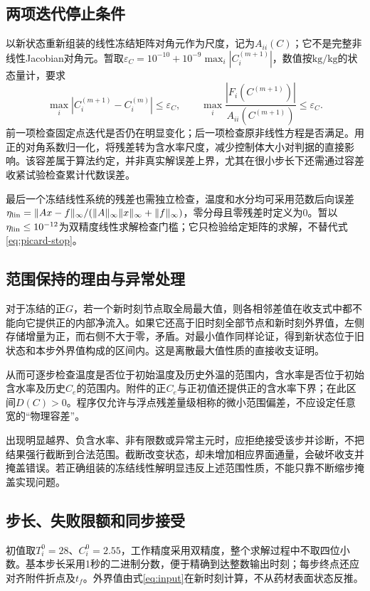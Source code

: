 \documentclass[UTF8,a4paper,zihao=-4,fontset=none]{ctexart}
\numberwithin{equation}{section}
\begin{document}
\subsection{两项迭代停止条件}
以新状态重新组装的线性冻结矩阵对角元作为尺度，记为$A_{ii}(C)$；它不是完整非线性Jacobian对角元。暂取$\varepsilon_C=10^{-10}+10^{-9}\max_i|C_i^{(m+1)}|$，数值按$\mathrm{kg/kg}$的状态量计，要求
\begin{equation}
\max_i|C_i^{(m+1)}-C_i^{(m)}|\le\varepsilon_C,
\qquad
\max_i\frac{|F_i(C^{(m+1)})|}{A_{ii}(C^{(m+1)})}\le\varepsilon_C.
\label{eq:picard-stop}
\end{equation}
前一项检查固定点迭代是否仍在明显变化；后一项检查原非线性方程是否满足。用正的对角系数归一化，将残差转为含水率尺度，减少控制体大小对判据的直接影响。该容差属于算法约定，并非真实解误差上界，尤其在很小步长下还需通过容差收紧试验检查累计代数误差。

最后一个冻结线性系统的残差也需独立检查，温度和水分均可采用范数后向误差$\eta_{\rm lin}=\|Ax-f\|_\infty/(\|A\|_\infty\|x\|_\infty+\|f\|_\infty)$，零分母且零残差时定义为0。暂以$\eta_{\rm lin}\le10^{-12}$为双精度线性求解检查门槛；它只检验给定矩阵的求解，不替代式\eqref{eq:picard-stop}。

\subsection{范围保持的理由与异常处理}
对于冻结的正$G$，若一个新时刻节点取全局最大值，则各相邻差值在收支式中都不能向它提供正的内部净流入。如果它还高于旧时刻全部节点和新时刻外界值，左侧存储增量为正，而右侧不大于零，矛盾。对最小值作同样论证，得到新状态位于旧状态和本步外界值构成的区间内。这是离散最大值性质的直接收支证明。

从而可逐步检查温度是否位于初始温度及历史外温的范围内，含水率是否位于初始含水率及历史$C_e$的范围内。附件的正$C_e$与正初值还提供正的含水率下界；在此区间$D(C)>0$。程序仅允许与浮点残差量级相称的微小范围偏差，不应设定任意宽的“物理容差”。

出现明显越界、负含水率、非有限数或异常主元时，应拒绝接受该步并诊断，不把结果强行截断到合法范围。截断改变状态，却未增加相应界面通量，会破坏收支并掩盖错误。若正确组装的冻结线性解明显违反上述范围性质，不能只靠不断缩步掩盖实现问题。

\subsection{步长、失败限额和同步接受}
初值取$T_i^0=28$、$C_i^0=2.55$，工作精度采用双精度，整个求解过程中不取四位小数。基本步长采用1秒的二进制分数，便于精确到达整数输出时刻；每步终点还应对齐附件折点及$t_f$。外界值由式\eqref{eq:input}在新时刻计算，不从药材表面状态反推。
\end{document}
